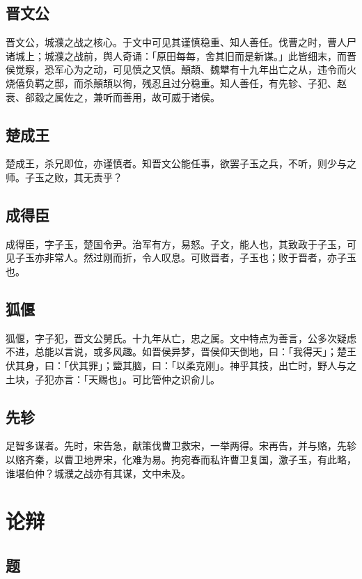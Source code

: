 \documentclass{article}
\begin{document}
\subsection{晋文公}

晋文公，城濮之战之核心。于文中可见其谨慎稳重、知人善任。伐曹之时，曹人尸诸城上；城濮之战前，舆人奇诵：「原田每每，舍其旧而是新谋。」此皆细末，而晋侯觉察，恐军心为之动，可见慎之又慎。顛頡、魏犨有十九年出亡之从，违令而火烧僖负羁之邸，而杀顛頡以徇，残忍且过分稳重。知人善任，有先轸、子犯、赵衰、郤縠之属佐之，兼听而善用，故可威于诸侯。

\subsection{楚成王}

楚成王，杀兄即位，亦谨慎者。知晋文公能任事，欲罢子玉之兵，不听，则少与之师。子玉之败，其无责乎？

\subsection{成得臣}

成得臣，字子玉，楚国令尹。治军有方，易怒。子文，能人也，其致政于子玉，可见子玉亦非常人。然过刚而折，令人叹息。可败晋者，子玉也；败于晋者，亦子玉也。

\subsection{狐偃}

狐偃，字子犯，晋文公舅氏。十九年从亡，忠之属。文中特点为善言，公多次疑虑不进，总能以言说，或多风趣。如晋侯异梦，晋侯仰天倒地，曰：「我得天」；楚王伏其身，曰：「伏其罪」；盬其脑，曰：「以柔克刚」。神乎其技，出亡时，野人与之土块，子犯亦言：「天赐也」。可比管仲之识俞儿。

\subsection{先轸}

足智多谋者。先时，宋告急，献策伐曹卫救宋，一举两得。宋再告，并与赂，先轸以赂齐秦，以曹卫地畀宋，化难为易。拘宛春而私许曹卫复国，激子玉，有此略，谁堪伯仲？城濮之战亦有其谋，文中未及。

\section{论辩}

\subsection*{题}
\end{document}
